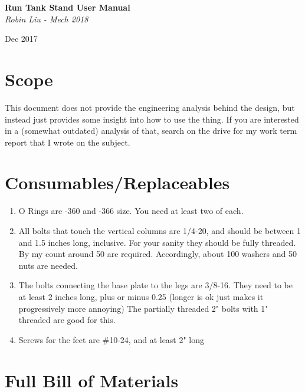 \documentclass[11pt]{article}
\begin{document}
\begin{titlepage}
   \begin{center}
      \Large\textbf{Run Tank Stand User Manual}\\
      \large\textit{Robin Liu - Mech 2018}
      
      Dec 2017
   \end{center}
\end{titlepage}

\section{Scope}
This document does not provide the engineering analysis behind the design, but instead just provides some insight into how to use the thing. If you are interested in a (somewhat outdated) analysis of that, search on the drive for my work term report that I wrote on the subject.

\section{Consumables/Replaceables}
\begin{enumerate}
	\item O Rings are -360 and -366 size. You need at least two of each.
	\item All bolts that touch the vertical columns are 1/4-20, and should be between 1 and 1.5 inches long, inclusive. For your sanity they should be fully threaded. By my count around 50 are required. Accordingly, about 100 washers and 50 nuts are needed.
	\item The bolts connecting the base plate to the legs are 3/8-16. They need to be at least 2 inches long, plus or minus 0.25 (longer is ok just makes it progressively more annoying) The partially threaded 2" bolts with 1" threaded are good for this.
	\item Screws for the feet are \#10-24, and at least 2" long
\end{enumerate}

\section{Full Bill of Materials}
\begin{tabular*}
	
\end{tabular*}
\end{document}
